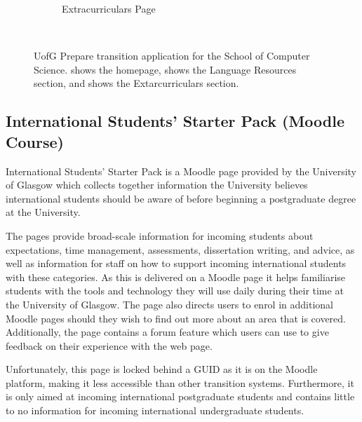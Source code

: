 \documentclass{l4proj}
\begin{document}
\begin{figure}[ht]
\begin{subfigure}[b]{0.25\textwidth}
        \caption{Extracurriculars Page}
        \label{fig:preparesrc}
    \end{subfigure}
    ~ %
    \caption{UofG Prepare transition application for the School of Computer Science.  shows the homepage,   shows the Language Resources section,  and  shows the Extarcurriculars section.
    }\label{fig:prepare}
\end{figure}

\subsection{International Students' Starter Pack (Moodle Course)}
International Students' Starter Pack is a Moodle page provided by the University of Glasgow which collects together information the University believes international students should be aware of before beginning a postgraduate degree at the University.

The pages provide broad-scale information for incoming students about expectations,  time management,  assessments,  dissertation writing,  and advice,  as well as information for staff on how to support incoming international students with these categories. As this is delivered on a Moodle page it helps familiarise students with the tools and technology they will use daily during their time at the University of Glasgow. The page also directs users to enrol in additional Moodle pages should they wish to find out more about an area that is covered. Additionally,  the page contains a forum feature which users can use to give feedback on their experience with the web page. 

Unfortunately,  this page is locked behind a GUID as it is on the Moodle platform,  making it less accessible than other transition systems. Furthermore,  it is only aimed at incoming international postgraduate students and contains little to no information for incoming international undergraduate students.

\end{document}
